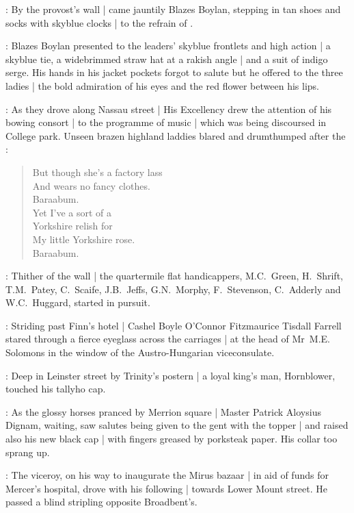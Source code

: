 :
By the provost's wall |
came jauntily Blazes Boylan,
stepping in tan shoes
and socks with skyblue clocks |
to the refrain of
.

:
Blazes Boylan presented to the leaders' skyblue frontlets and high action |
a skyblue tie,
a widebrimmed straw hat at a rakish angle |
and a suit of indigo serge.
His hands in his jacket pockets forgot to salute 
but he offered to the three ladies |
the bold admiration of his eyes
and the red flower between his lips.

:
As they drove along Nassau street |
His Excellency
drew the attention of his bowing consort |
to the programme of music |
which was being discoursed in College park.
Unseen brazen highland laddies
blared and drumthumped
after the :%

\begin{verse}
    But though she's a factory lass \\
    And wears no fancy clothes. \\
    Baraabum. \\
    Yet I've a sort of a \\
    Yorkshire relish for \\
    My little Yorkshire rose. \\
    Baraabum.
\end{verse}

:
Thither of the wall |
the quartermile flat handicappers,
M.C.~Green,
H.~Shrift,
T.M.~Patey,
C.~Scaife,
J.B.~Jeffs,
G.N.~Morphy,
F.~Stevenson,
C.~Adderly
and W.C.~Huggard,
started in pursuit.%

:
Striding past Finn's hotel |
Cashel Boyle O'Connor Fitzmaurice Tisdall Farrell
stared through a fierce eyeglass
across the carriages |
at the head of Mr~M.E. Solomons
in the window of the Austro-Hungarian viceconsulate.

:
Deep in Leinster street by Trinity's postern |
a loyal king's man, Hornblower,
touched his tallyho cap.

:
As the glossy horses pranced by Merrion square |
Master Patrick Aloysius Dignam, waiting,
saw salutes being given to the gent with the topper |
and raised also his new black cap |
with fingers greased by porksteak paper.
His collar too sprang up.

:
The viceroy,
on his way to inaugurate the Mirus bazaar |
in aid of funds for Mercer's hospital,%
drove with his following |
towards Lower Mount street.
He passed a blind stripling opposite Broadbent's.

